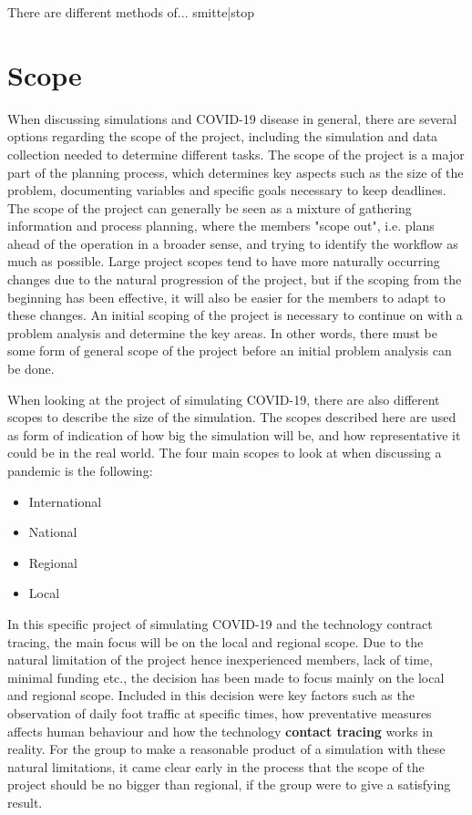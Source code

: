 There are different methods of... smitte|stop

\section{Scope}

When discussing simulations and COVID-19 disease in general, there are several options regarding the scope of the project, including the simulation and data collection needed to determine different tasks. The scope of the project is a major part of the planning process, which determines key aspects such as the size of the problem, documenting variables and specific goals necessary to keep deadlines.
The scope of the project can generally be seen as a mixture of gathering information and process planning, where the members "scope out", i.e. plans ahead of the operation in a broader sense, and trying to identify the workflow as much as possible. \newline
Large project scopes tend to have more naturally occurring changes due to the natural progression of the project, but if the scoping from the beginning has been effective, it will also be easier for the members to adapt to these changes. An initial scoping of the project is necessary to continue on with a problem analysis and determine the key areas. In other words, there must be some form of general scope of the project before an initial problem analysis can be done.  

When looking at the project of simulating COVID-19, there are also different scopes to describe the size of the simulation. The scopes described here are used as form of indication of how big the simulation will be, and how representative it could be in the real world. 
The four main scopes to look at when discussing a pandemic is the following: 

\begin{itemize}
\item International
\item National
\item Regional
\item Local
\end{itemize}

In this specific project of simulating COVID-19 and the technology contract tracing, the main focus will be on the local and regional scope. Due to the natural limitation of the project hence inexperienced members, lack of time, minimal funding etc., the decision has been made to focus mainly on the local and regional scope. Included in this decision were key factors such as the observation of daily foot traffic at specific times, how preventative measures affects human behaviour and how the technology \textbf{contact tracing} works in reality. For the group to make a reasonable product of a simulation with these natural limitations, it came clear early in the process that the scope of the project should be no bigger than regional, if the group were to give a satisfying result. 

